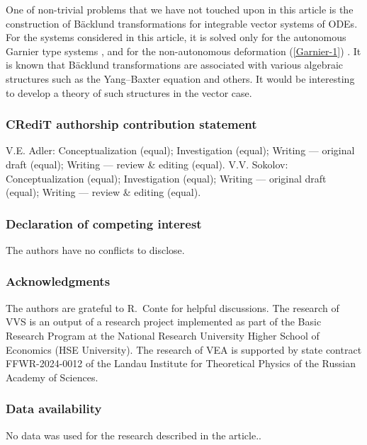 \documentclass[11pt]{article}
\theoremstyle{plain}
\theoremstyle{definition}
\begin{document}
One of non-trivial problems that we have not touched upon in this article is the construction of B\"acklund transformations for integrable vector systems of ODEs. For the systems considered in this article, it is solved only for the autonomous Garnier type systems \cite{Suris_2003}, and for the non-autonomous deformation (\ref{Garnier-1}) \cite{Adler_Kolesnikov_2023}. It is known that B\"acklund transformations are associated with various algebraic structures such as the Yang--Baxter equation and others. It would be interesting to develop a theory of such structures in the vector case. 

\subsubsection*{CRediT authorship contribution statement}

V.E. Adler: Conceptualization (equal); Investigation (equal); Writing --- original draft (equal); Writing --- review \& editing (equal). V.V. Sokolov: Conceptualization (equal); Investigation (equal); Writing --- original draft (equal); Writing --- review \& editing (equal).

\subsubsection*{Declaration of competing interest}

The authors have no conflicts to disclose.

\subsubsection*{Acknowledgments}

The authors are grateful to R.~Conte for helpful discussions. The research of VVS is an output of a research project implemented as part of the Basic Research Program at the National Research University Higher School of Economics (HSE University). The research of VEA is supported by state contract FFWR-2024-0012 of the Landau Institute for Theoretical Physics of the Russian Academy of Sciences.

\subsubsection*{Data availability}

No data was used for the research described in the article..
\end{document}
